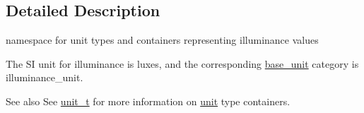 \subsection{Detailed Description}
namespace for unit types and containers representing illuminance values 

The S\+I unit for illuminance is {\ttfamily luxes}, and the corresponding {\ttfamily \hyperlink{structunits_1_1base__unit}{base\+\_\+unit}} category is {\ttfamily illuminance\+\_\+unit}. \begin{DoxySeeAlso}{See also}
See \hyperlink{classunits_1_1unit__t}{unit\+\_\+t} for more information on \hyperlink{structunits_1_1unit}{unit} type containers. 
\end{DoxySeeAlso}
